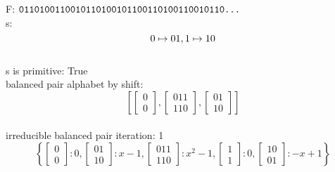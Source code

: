 F: $ \text{\texttt{0110100110010110100101100110100110010110...}}  $ \\
s: $$0 \mapsto 01\\, 1 \mapsto 10\\$$ \\
s is primitive: True  \\
balanced pair alphabet by shift: $$ \left[\begin{bmatrix}0\\ 0\end{bmatrix}, \begin{bmatrix}011\\ 110\end{bmatrix}, \begin{bmatrix}01\\ 10\end{bmatrix}\right] $$ \\
irreducible balanced pair iteration: 1  \\ 
$$ \left\{\begin{bmatrix}0\\ 0\end{bmatrix} : 0, \begin{bmatrix}01\\ 10\end{bmatrix} : x - 1, \begin{bmatrix}011\\ 110\end{bmatrix} : x^{2} - 1, \begin{bmatrix}1\\ 1\end{bmatrix} : 0, \begin{bmatrix}10\\ 01\end{bmatrix} : -x + 1\right\} $$ \\
